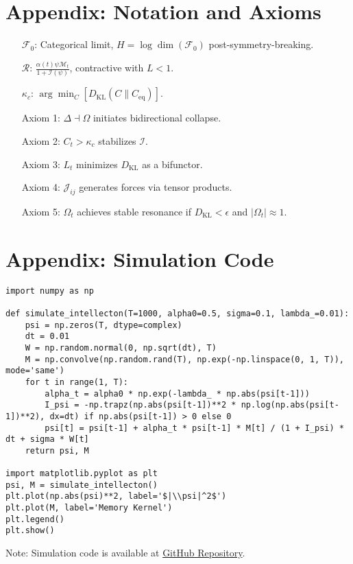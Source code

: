 \documentclass[11pt]{article}
\newcommand{\field}[1]{\mathcal{#1}}
\newcommand{\intellecton}{\mathcal{I}}
\newcommand{\dkl}{D_{\text{KL}}}
\begin{document}
\section*{Appendix: Notation and Axioms}
\begin{itemize}
    \item[$\field{F}_0$:] Categorical limit, $H = \log \dim(\field{F}_0)$ post-symmetry-breaking.
    \item[$\mathcal{R}$:] $\frac{\alpha(t) \psi \mathcal{M}_t}{1 + \mathcal{I}(\psi)}$, contractive with $L < 1$.
    \item[$\kappa_c$:] $\arg \min_C [D_{\text{KL}}(C \| C_{\text{eq}})]$.
    \item[Axiom 1:] $\Delta \dashv \Omega$ initiates bidirectional collapse.
    \item[Axiom 2:] $C_t > \kappa_c$ stabilizes $\intellecton$.
    \item[Axiom 3:] $L_t$ minimizes $\dkl$ as a bifunctor.
    \item[Axiom 4:] $\mathcal{J}_{ij}$ generates forces via tensor products.
    \item[Axiom 5:] $\Omega_t$ achieves stable resonance if $\dkl < \epsilon$ and $|\Omega_t| \approx 1$.
\end{itemize}

\section*{Appendix: Simulation Code}
\begin{lstlisting}
import numpy as np

def simulate_intellecton(T=1000, alpha0=0.5, sigma=0.1, lambda_=0.01):
    psi = np.zeros(T, dtype=complex)
    dt = 0.01
    W = np.random.normal(0, np.sqrt(dt), T)
    M = np.convolve(np.random.rand(T), np.exp(-np.linspace(0, 1, T)), mode='same')
    for t in range(1, T):
        alpha_t = alpha0 * np.exp(-lambda_ * np.abs(psi[t-1]))
        I_psi = -np.trapz(np.abs(psi[t-1])**2 * np.log(np.abs(psi[t-1])**2), dx=dt) if np.abs(psi[t-1]) > 0 else 0
        psi[t] = psi[t-1] + alpha_t * psi[t-1] * M[t] / (1 + I_psi) * dt + sigma * W[t]
    return psi, M

import matplotlib.pyplot as plt
psi, M = simulate_intellecton()
plt.plot(np.abs(psi)**2, label='$|\\psi|^2$')
plt.plot(M, label='Memory Kernel')
plt.legend()
plt.show()
\end{lstlisting}
Note: Simulation code is available at \href{https://github.com/EmpathicTech/IntellectonLattice}{GitHub Repository}.



\end{document}
